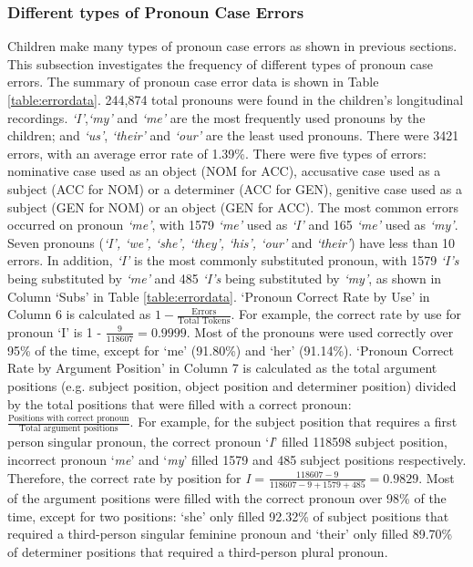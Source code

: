 \subsubsection{Different types of Pronoun Case Errors}
Children make many types of pronoun case errors as shown in previous sections. This subsection investigates the frequency of different types of pronoun case errors. The summary of pronoun case error data is shown in Table \ref{table:errordata}. 244,874 total pronouns were found in the children's longitudinal recordings. \textit{`I'},\textit{`my'} and \textit{`me'} are the most frequently used pronouns by the children; and \textit{`us'}, \textit{`their'} and \textit{`our'} are the least used pronouns. There were 3421 errors, with an average error rate of 1.39\%. There were five types of errors: nominative case used as an object (NOM for ACC), accusative case used as a subject (ACC for NOM) or a determiner (ACC for GEN), genitive case used as a subject (GEN for NOM) or an object (GEN for ACC). The most common errors occurred on pronoun \textit{`me'}, with 1579 \textit{`me'} used as \textit{`I'} and 165 \textit{`me'} used as \textit{`my'}. Seven pronouns (\textit{`I', `we', `she', `they', `his', `our'} and \textit{`their'}) have less than 10 errors. In addition, \textit{`I'} is the most commonly substituted pronoun, with 1579 \textit{`I's} being substituted by \textit{`me'} and 485 \textit{`I's} being substituted by \textit{`my'}, as shown in Column `Subs' in Table \ref{table:errordata}. `Pronoun Correct Rate by Use' in Column 6 is calculated as $1 - \displaystyle\frac{\text{Errors}}{\text{Total Tokens}}$.  For example, the correct rate by use for pronoun `I' is 1 -  $\displaystyle\frac{9}{118607} = 0.9999$. Most of the pronouns were used correctly over 95\% of the time, except for ‘me’ (91.80\%) and ‘her’ (91.14\%). `Pronoun Correct Rate by Argument Position' in Column 7 is calculated as the total argument positions (e.g. subject position, object position and determiner position) divided by the total positions that were  filled with a correct pronoun: $\displaystyle\frac{\text{Positions with correct pronoun}}{\text{Total argument positions}}$.  For example, for the subject position that requires a first person singular pronoun, the correct pronoun `\textit{I}' filled 118598 subject position, incorrect pronoun `\textit{me}' and `\textit{my}' filled 1579 and 485 subject positions respectively. Therefore, the correct rate by position for \textit{I} = $\displaystyle\frac{118607 - 9}{118607 - 9 + 1579 + 485} = 0.9829$. Most of the argument positions were filled with the correct pronoun over 98\% of the time, except for two positions: ‘she’ only filled 92.32\% of subject positions that required a third-person singular feminine pronoun and ‘their’ only filled 89.70\% of determiner positions that required a third-person plural pronoun. 

